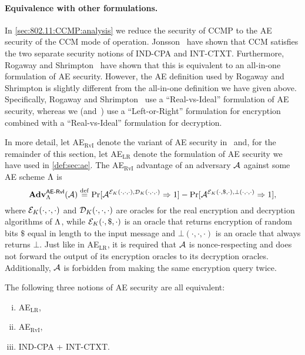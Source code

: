 \paragraph{Equivalence with other formulations.}
In \cref{sec:802.11:CCMP:analysis} we reduce the security of CCMP to the AE security of the CCM mode of operation.
Jonsson~\cite{SAC:Jonsson02} have shown that CCM satisfies the two separate security notions of IND-CPA and INT-CTXT.
Furthermore,
Rogaway and Shrimpton~\cite{EC:RogShr06} have shown that this is equivalent to an all-in-one formulation of AE security.
However,
the AE definition used by Rogaway and Shrimpton is slightly different from the all-in-one definition we have given above.
Specifically,
Rogaway and Shrimpton~\cite{EC:RogShr06} use a ``Real-vs-Ideal'' formulation of AE security,
whereas we (and~\cite{AC:PatRisShr11}) use a ``Left-or-Right'' formulation for encryption combined with a ``Real-vs-Ideal'' formulation for decryption.

In more detail,
let AE$_{\text{RvI}}$ denote the variant of AE security in~\cite{EC:RogShr06} and,
for the remainder of this section,
let AE$_\text{LR}$ denote the formulation of AE security we have used in \cref{def:sec:ae}.
The AE$_{\text{RvI}}$ advantage of an adversary $\mathcal{A}$ against some AE scheme $\Lambda$ is
\begin{equation}
	\mathbf{Adv}_{\Lambda}^{\operatorname{\mathsf{\mathsf{AE}-RvI}}}(\mathcal{A}) \overset{\mathrm{def}}{=} 
		\Pr[\mathcal{A}^{\mathcal{E}_K(\cdot, \cdot, \cdot), \mathcal{D}_K(\cdot, \cdot, \cdot)} \Rightarrow 1]
			- \Pr[\mathcal{A}^{\mathcal{E}_K(\cdot, \$, \cdot), \bot(\cdot, \cdot, \cdot)} \Rightarrow 1] ,
\end{equation}
where $\mathcal{E}_K(\cdot, \cdot, \cdot)$ and $\mathcal{D}_K(\cdot, \cdot, \cdot)$ are oracles for the real encryption and decryption algorithms of $\Lambda$,
while $\mathcal{E}_K(\cdot, \$, \cdot)$ is an oracle that returns encryption of random bits $\$$ equal in length to the input message and $\bot(\cdot, \cdot, \cdot)$ is an oracle that always returns $\bot$.
Just like in AE$_{\text{LR}}$,
it is required that $\mathcal{A}$ is nonce-respecting and does not forward the output of its encryption oracles to its decryption oracles.
Additionally, $\mathcal{A}$ is forbidden from making the same encryption query twice.


\begin{theorem}[Informal]
The following three notions of AE security are all equivalent:
\begin{enumerate}[(i)]
	\item AE$_\text{LR}$,
	
	\item AE$_\text{RvI}$, 
	
	\item IND-CPA + INT-CTXT.
\end{enumerate}
\end{theorem}

